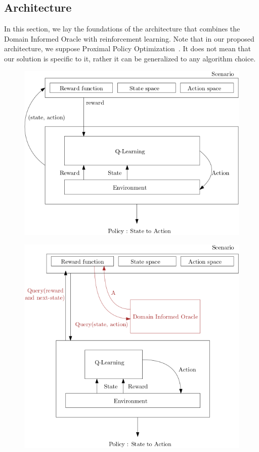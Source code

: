\subsection{Architecture}
In this section, we lay the foundations of the architecture that combines the Domain Informed Oracle with 
reinforcement learning. Note that in our proposed architecture, we suppose Proximal Policy Optimization~\cite{schulman17ppo}. 
It does not mean that our solution is specific to it, rather it can be generalized to any algorithm choice.

\begin{figure}[H]
  \centering
  \begin{minipage}{.5\textwidth}
    \centering
    \includegraphics[width=1\linewidth]{figures/basicrl.png}
    \label{fig:basicrl}
  \end{minipage}%
  \begin{minipage}{.45\textwidth}
    \centering
    \includegraphics[width=1\linewidth]{figures/dio.png}
    \label{fig:diorl}
  \end{minipage}
\end{figure}

